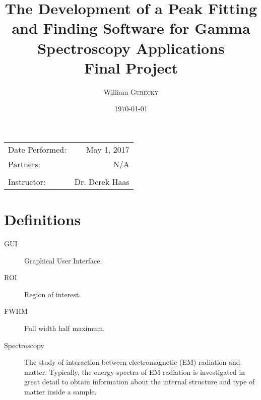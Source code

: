 \documentclass[10pt]{article}
\title{The Development of a Peak Fitting and Finding Software for Gamma Spectroscopy Applications \\
\bigskip \large Final Project} %
\author{William \textsc{Gurecky}} %
\date{\today} %
\begin{document}
\maketitle %

\begin{center}
\begin{tabular}{l r}
Date Performed: & May 1, 2017 \\ %
Partners: &  N/A \\ %
&  \\
Instructor: & Dr.  Derek Haas %
\end{tabular}
\end{center}



\pagebreak
\section*{Definitions}
\label{definitions}
\begin{description}

\item[GUI]  Graphical User Interface.

\item[ROI]  Region of interest.

\item[FWHM]  Full width half maximum.

\item[Spectroscopy]
The study of interaction between electromagnetic (EM) radiation and matter.  Typically, the energy spectra of EM radiation is investigated in great detail to obtain information about the internal structure and type of matter inside a sample.

\end{description}

\end{document}
